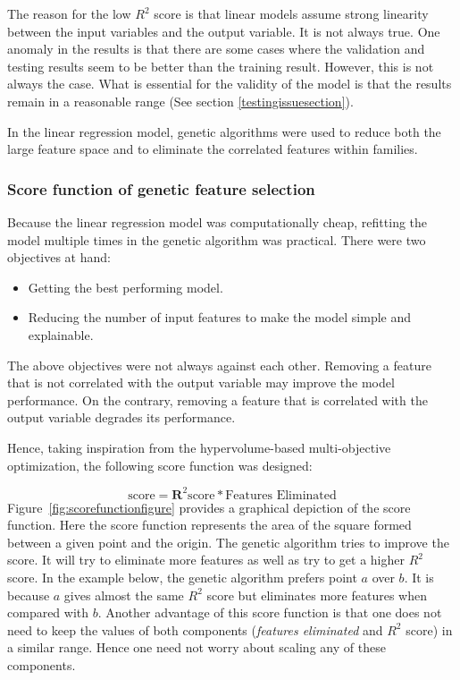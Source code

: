 \documentclass[11pt]{article}
\begin{document}
The reason for the low $R^2$ score is that linear models assume strong linearity between the input variables and the output variable.
It is not always true.
One anomaly in the results is that there are some cases where the validation and testing results seem to be better than the training result.
However, this is not always the case.
What is essential for the validity of the model is that the results remain in a reasonable range (See section \ref{testingissuesection}).

In the linear regression model,  genetic algorithms were used to reduce both the large feature space and to eliminate the correlated features within families. 

\subsubsection{Score function of genetic feature selection}
\label{GenerationScoringFunction}
Because the linear regression model was computationally cheap, refitting the model multiple times in the genetic algorithm was practical.
There were two objectives at hand:
\begin{itemize}
\item Getting the best performing model.
\item Reducing the number of input features to make the model simple and explainable.
\end{itemize}
The above objectives were not always against each other.
Removing a feature that is not correlated with the output variable may improve the model performance. On the contrary, removing a feature that is correlated with the output variable degrades its performance.

Hence, taking inspiration from the hypervolume-based multi-objective optimization, the following score function was designed:

$$
\textrm{score} = \mathbf{R}^2 \textrm{score} * \textrm{Features Eliminated}
$$
Figure~\ref{fig:scorefunctionfigure} provides a graphical depiction of the score function.
Here the score function represents the area of the square formed between a given point and the origin.
The genetic algorithm tries to improve the score. It will try to eliminate more features as well as try to get a higher $R^2$ score.
In the example below, the genetic algorithm prefers point $a$ over $b$. It is because $a$ gives almost the same $R^2$ score but eliminates more features when compared with $b$.
Another advantage of this score function is that one does not need to keep the values of both components (\textit{features eliminated} and \textit{$R^2$} score) in a similar range.
Hence one need not worry about scaling any of these components.
\end{document}
